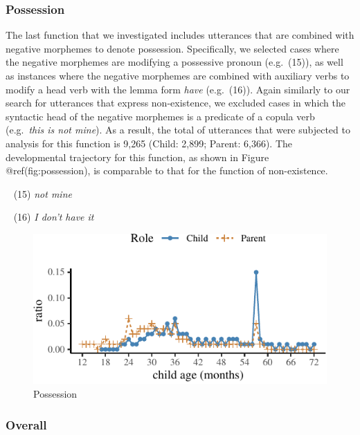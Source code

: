 \documentclass[10pt, letterpaper]{article}
\newenvironment{CodeChunk}{}{}
\begin{document}
\hypertarget{possession}{%
\subsubsection{Possession}\label{possession}}

The last function that we investigated includes utterances that are
combined with negative morphemes to denote possession. Specifically, we
selected cases where the negative morphemes are modifying a possessive
pronoun (e.g.~(15)), as well as instances where the negative morphemes
are combined with auxiliary verbs to modify a head verb with the lemma
form \emph{have} (e.g.~(16)). Again similarly to our search for
utterances that express non-existence, we excluded cases in which the
syntactic head of the negative morphemes is a predicate of a copula verb
(e.g.~\emph{this is not mine}). As a result, the total of utterances
that were subjected to analysis for this function is 9,265 (Child:
2,899; Parent: 6,366). The developmental trajectory for this function,
as shown in Figure @ref(fig:possession), is comparable to that for the
function of non-existence.

~ (15) \emph{not mine}

~ (16) \emph{I don't have it}

\begin{CodeChunk}
\begin{figure}[H]

{\centering \includegraphics{figs/possession-1} 

}

\caption[Possession]{Possession}\label{fig:possession}
\end{figure}
\end{CodeChunk}

\hypertarget{overall}{%
\subsubsection{Overall}\label{overall}}
\end{document}
